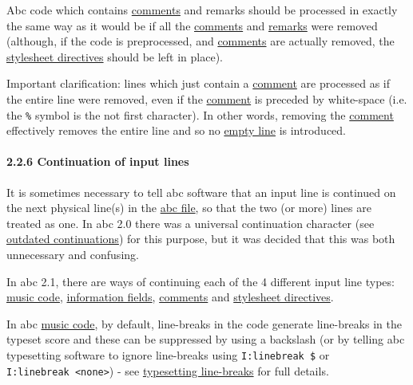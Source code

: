 Abc code which contains \protect\hyperlink{comment_definition}{comments}
and remarks should be processed in exactly the same way as it would be
if all the \protect\hyperlink{comment_definition}{comments} and
\protect\hyperlink{remark_definition}{remarks} were removed (although,
if the code is preprocessed, and
\protect\hyperlink{comment_definition}{comments} are actually removed,
the \protect\hyperlink{stylesheet_directive_definition}{stylesheet
directives} should be left in place).

Important clarification: lines which just contain a
\protect\hyperlink{comment_definition}{comment} are processed as if the
entire line were removed, even if the
\protect\hyperlink{comment_definition}{comment} is preceded by
white-space (i.e. the \texttt{\%} symbol is the not first character). In
other words, removing the
\protect\hyperlink{comment_definition}{comment} effectively removes the
entire line and so no \protect\hyperlink{empty_line_definition}{empty
line} is introduced.

\hypertarget{continuation_of_input_lines}{\paragraph{2.2.6 Continuation
of input lines}\label{continuation_of_input_lines}}

It is sometimes necessary to tell abc software that an input line is
continued on the next physical line(s) in the
\protect\hyperlink{abc_file_definition}{abc file}, so that the two (or
more) lines are treated as one. In abc 2.0 there was a universal
continuation character (see
\protect\hyperlink{outdated_continuations}{outdated continuations}) for
this purpose, but it was decided that this was both unnecessary and
confusing.

In abc 2.1, there are ways of continuing each of the 4 different input
line types: \protect\hyperlink{music_code_definition}{music code},
\protect\hyperlink{information_field_definition}{information fields},
\protect\hyperlink{comment_definition}{comments} and
\protect\hyperlink{stylesheet_directive_definition}{stylesheet
directives}.

In abc \protect\hyperlink{music_code_definition}{music code}, by
default, line-breaks in the code generate line-breaks in the typeset
score and these can be suppressed by using a backslash (or by telling
abc typesetting software to ignore line-breaks using
\texttt{I:linebreak\ \$} or
\texttt{I:linebreak\ \textless{}none\textgreater{}}) - see
\protect\hyperlink{typesetting_line-breaks}{typesetting line-breaks} for
full details.

